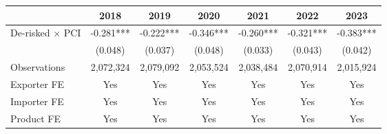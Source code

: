 \begin{tabular}{lcccccc}
\toprule
 & 2018 & 2019 & 2020 & 2021 & 2022 & 2023 \\
\midrule
De-risked $\times$ PCI & -0.281*** & -0.222*** & -0.346*** & -0.260*** & -0.321*** & -0.383*** \\
 & (0.048) & (0.037) & (0.048) & (0.033) & (0.043) & (0.042) \\
\midrule
Observations & 2,072,324 & 2,079,092 & 2,053,524 & 2,038,484 & 2,070,914 & 2,015,924 \\
Exporter FE & Yes & Yes & Yes & Yes & Yes & Yes \\
Importer FE & Yes & Yes & Yes & Yes & Yes & Yes \\
Product FE & Yes & Yes & Yes & Yes & Yes & Yes \\
\bottomrule
\end{tabular}